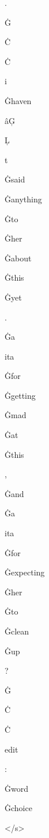 \documentclass[varwidth]{standalone}
\begin{document}
\begin{CJK*}{UTF8}{gbsn}
{{{\colorbox{red!0.8888889}{\strut .} \colorbox{red!0.8888889}{\strut Ġ} \colorbox{red!0.0}{\strut Ċ} \colorbox{red!0.0}{\strut Ċ} \colorbox{red!6.125}{\strut i} \colorbox{red!0.0}{\strut Ġhaven} \colorbox{red!0.8888889}{\strut âĢ} \colorbox{red!0.0}{\strut Ļ} \colorbox{red!0.0}{\strut t} \colorbox{red!2.0}{\strut Ġsaid} \colorbox{red!2.0}{\strut Ġanything} \colorbox{red!0.8888889}{\strut Ġto} \colorbox{red!1.388889}{\strut Ġher} \colorbox{red!29.38889}{\strut Ġabout} \colorbox{red!0.0}{\strut Ġthis} \colorbox{red!0.4201389}{\strut Ġyet} \colorbox{red!1.125}{\strut .} \colorbox{red!122.72223}{\strut Ġa} \colorbox{red!150.22223}{\strut ita} \colorbox{red!3.5555556}{\strut Ġfor} \colorbox{red!14.222222}{\strut Ġgetting} \colorbox{red!43.555557}{\strut Ġmad} \colorbox{red!8.0}{\strut Ġat} \colorbox{red!0.0}{\strut Ġthis} \colorbox{red!1.8368056}{\strut ,} \colorbox{red!9.03125}{\strut Ġand} \colorbox{red!18.0}{\strut Ġa} \colorbox{red!10.888889}{\strut ita} \colorbox{red!2.0}{\strut Ġfor} \colorbox{red!0.4201389}{\strut Ġexpecting} \colorbox{red!2.7222223}{\strut Ġher} \colorbox{red!0.5}{\strut Ġto} \colorbox{red!1.2534723}{\strut Ġclean} \colorbox{red!0.34722224}{\strut Ġup} \colorbox{red!12.920139}{\strut ?} \colorbox{red!3.125}{\strut Ġ} \colorbox{red!43.555557}{\strut Ċ} \colorbox{red!68.05555}{\strut Ċ} \colorbox{red!128.0}{\strut edit} \colorbox{red!0.8888889}{\strut :} \colorbox{red!0.6805556}{\strut Ġword} \colorbox{red!5.555556}{\strut Ġchoice} \colorbox{red!0.0}{\strut </s>} 
}}}
\end{CJK*}
\end{document}
